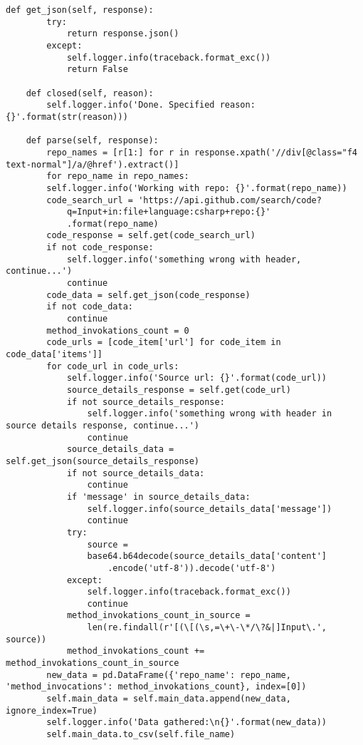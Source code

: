 \begin{lstlisting}[caption={Исходный код класса обработки веб-страниц проектов с сайта GitHub.com},label=spider]
	def get_json(self, response):
		try:
			return response.json()
		except:
			self.logger.info(traceback.format_exc())
			return False
	
	def closed(self, reason):
		self.logger.info('Done. Specified reason: {}'.format(str(reason)))
	
	def parse(self, response):
		repo_names = [r[1:] for r in response.xpath('//div[@class="f4 text-normal"]/a/@href').extract()]
		for repo_name in repo_names:
		self.logger.info('Working with repo: {}'.format(repo_name))
		code_search_url = 'https://api.github.com/search/code?
			q=Input+in:file+language:csharp+repo:{}'
			.format(repo_name)
		code_response = self.get(code_search_url)
		if not code_response:
			self.logger.info('something wrong with header, continue...')
			continue
		code_data = self.get_json(code_response)
		if not code_data:
			continue
		method_invokations_count = 0
		code_urls = [code_item['url'] for code_item in code_data['items']]
		for code_url in code_urls:
			self.logger.info('Source url: {}'.format(code_url))
			source_details_response = self.get(code_url)
			if not source_details_response:
				self.logger.info('something wrong with header in source details response, continue...')
				continue
			source_details_data = self.get_json(source_details_response)
			if not source_details_data:
				continue
			if 'message' in source_details_data:
				self.logger.info(source_details_data['message'])
				continue
			try:
				source = 
				base64.b64decode(source_details_data['content']
					.encode('utf-8')).decode('utf-8')
			except:
				self.logger.info(traceback.format_exc())
				continue
			method_invokations_count_in_source = 
				len(re.findall(r'[(\[(\s,=\+\-\*/\?&|]Input\.', source))
			method_invokations_count += method_invokations_count_in_source
		new_data = pd.DataFrame({'repo_name': repo_name, 'method_invocations': method_invokations_count}, index=[0])
		self.main_data = self.main_data.append(new_data, ignore_index=True)
		self.logger.info('Data gathered:\n{}'.format(new_data))
		self.main_data.to_csv(self.file_name)
\end{lstlisting}
\newpage
